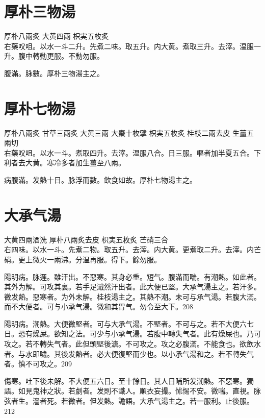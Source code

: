 \section{厚朴三物湯}

厚朴{\scriptsize 八兩炙} 大黄{\scriptsize 四兩} 枳実{\scriptsize 五枚炙}\\
右藥㕮咀。以水一斗二升。先煮二味。取五升。内大黄。煮取三升。去滓。温服一升。腹中轉動更服。不動勿服。

腹滿。脉數。厚朴三物湯主之。

\section{厚朴七物湯}

厚朴{\scriptsize 八兩炙} 甘草{\scriptsize 三兩炙} 大黄{\scriptsize 三兩} 大棗{\scriptsize 十枚擘} 枳実{\scriptsize 五枚炙} 桂枝{\scriptsize 二兩去皮} 生薑{\scriptsize 五兩切}\\
右藥㕮咀。以水一斗。煮取四升。去滓。温服八合。日三服。嘔者加半夏五合。下利者去大黄。寒冷多者加生薑至八兩。

病腹滿。发熱十日。脉浮而數。飲食如故。厚朴七物湯主之。

\section{大承气湯}

大黄{\scriptsize 四兩酒洗} 厚朴{\scriptsize 八兩炙去皮} 枳実{\scriptsize 五枚炙} 芒硝{\scriptsize 三合}\\
右四味。以水一斗。先煮二物。取五升。去滓。内大黄。更煮取二升。去滓。内芒硝。更上微火一兩沸。分温再服。得下。餘勿服。

陽明病。脉遲。雖汗出。不惡寒。其身必重。短气。腹滿而喘。有潮熱。如此者。其外为解。可攻其裏。若手足濈然汗出者。此大便已堅。{\khaai 大}承气湯主之。若汗多。微发熱。惡寒者。为外未解。{\khaai 桂枝湯主之。}其熱不潮。未可与承气湯。若腹大滿。而不大便者。可与小承气湯。微和其胃气。勿令至大下。208

陽明病。潮熱。大便微堅者。可与{\khaai 大}承气湯。不堅者。不可与之。若不大便六七日。恐有燥屎。欲知之法。可少与小承气湯。若腹中轉失气者。此有燥屎也。乃可攻之。若不轉失气者。此但頭堅後溏。不可攻之。攻之必腹滿。不能食也。欲飲水者。与水即噦。其後发熱者。必大便復堅而少也。以小承气湯和之。若不轉失气者。慎不可攻之。209

傷寒。吐下後未解。不大便五六日。至十餘日。其人日晡所发潮熱。不惡寒。獨語。如見鬼{\khaai 神之}狀。若劇者。发則不識人。順衣妄撮。怵惕不安。微喘。直視。脉弦者生。濇者死。{\khaai 若}微者。但发熱。譫語。{\khaai 大}承气湯主之。若一服利。止後服。212

